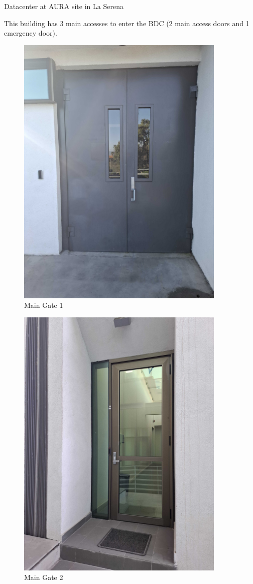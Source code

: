 Datacenter at AURA site in La Serena

This building has 3 main accesses to enter the BDC (2 main access doors and 1 emergency door).

\begin{figure}
    \includegraphics[width=10cm]{15.jpg}
    \centering
    \caption*{Main Gate 1}
  \end{figure}

  \newpage

\begin{figure}
    \includegraphics[width=10cm]{16.jpg}
    \centering
    \caption*{Main Gate 2}
  \end{figure}

